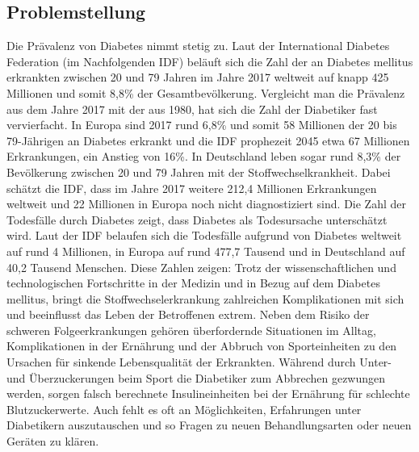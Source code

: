 \documentclass[a4paper,11pt]{article}%
\renewcommand{\\}{\vspace*{0.5\baselineskip} \newline}
\begin{document}
\subsection{Problemstellung}
	Die Prävalenz von Diabetes nimmt stetig zu. Laut der International Diabetes Federation (im Nachfolgenden IDF) beläuft sich die Zahl der an Diabetes mellitus erkrankten zwischen 20 und 79 Jahren im Jahre 2017 weltweit auf knapp 425 Millionen 
	und somit 8,8\% der Gesamtbevölkerung. Vergleicht man die Prävalenz aus dem Jahre 2017 mit der aus 1980, hat sich die Zahl der Diabetiker fast vervierfacht.\cite[S. 9]{IDF}\newline
	In Europa sind 2017 rund 6,8\% und somit 58 Millionen der 20 bis 79-Jährigen an Diabetes erkrankt und die IDF prophezeit 2045 etwa 67 Millionen Erkrankungen, ein Anstieg von 16\%. In Deutschland leben sogar rund 8,3\% der Bevölkerung zwischen 20 und 79 Jahren mit der Stoffwechselkrankheit. Dabei schätzt die IDF, dass im Jahre 2017 weitere 212,4 Millionen Erkrankungen weltweit und 22 Millionen in Europa noch nicht diagnostiziert sind.\cite[S. 110 ff.]{IDF}\newline
	Die Zahl der Todesfälle durch Diabetes zeigt, dass Diabetes als Todesursache unterschätzt wird. Laut der IDF belaufen sich die Todesfälle aufgrund von Diabetes weltweit auf rund 4 Millionen, in Europa auf rund 477,7 Tausend und in Deutschland auf 40,2 Tausend Menschen.\cite[S. 46]{IDF}\\
	Diese Zahlen zeigen: Trotz der wissenschaftlichen und technologischen Fortschritte in der Medizin und in Bezug auf dem Diabetes mellitus, bringt die Stoffwechselerkrankung zahlreichen Komplikationen mit sich und beeinflusst das Leben der Betroffenen extrem. Neben dem Risiko der schweren Folgeerkrankungen gehören überfordernde Situationen im Alltag, Komplikationen in der Ernährung und der Abbruch von Sporteinheiten zu den Ursachen für sinkende Lebensqualität der Erkrankten. \newline
	Während durch Unter- und Überzuckerungen beim Sport die Diabetiker zum Abbrechen gezwungen werden, sorgen falsch berechnete Insulineinheiten bei der Ernährung für schlechte Blutzuckerwerte. Auch fehlt es oft an Möglichkeiten, Erfahrungen unter Diabetikern auszutauschen und so Fragen zu neuen Behandlungsarten oder neuen Geräten zu klären.
\end{document}
